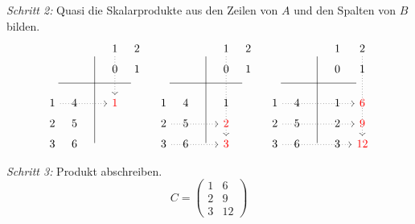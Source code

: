 \bigskip{}

\vbox{
\emph{Schritt 2:} Quasi die Skalarprodukte aus den Zeilen von $A$ und den Spalten von $B$ bilden.
\[
\begin{tikzcd}[sep=tiny]
                      &   & \,\arrow[dash]{ddddd} & 1\arrow[dotted]{ddd} & 2\\
                      &   &                       & 0                    & 1\\
\,\arrow[dash]{rrrr}  &   &                       &                      & \,\\
1 \arrow[dotted]{rrr} & 4 &                       & {\color{red}1}\\
2                     & 5\\
3                     & 6 & \,
\end{tikzcd}
%
\quad
%
\begin{tikzcd}[sep=tiny]
                     &   & \,\arrow[dash]{ddddd} & 1\arrow[dotted]{ddddd} & 2 \\
                     &   &                       & 0                      & 1 \\
\,\arrow[dash]{rrrr} &   &                       &                        & \,\\
1                    & 4 &                       & 1                          \\
2\arrow[dotted]{rrr} & 5 &                       & {\color{red}2}             \\
3\arrow[dotted]{rrr} & 6 & \,                    & {\color{red}3}
\end{tikzcd}
%
\quad
%
\begin{tikzcd}[sep=tiny]
                      &   & \,\arrow[dash]{ddddd} & 1 & 2\arrow[dotted]{ddddd}\\
                      &   &                       & 0 & 1               \\
\,\arrow[dash]{rrrr}  &   &                       &   & \,              \\
1\arrow[dotted]{rrrr} & 4 &                       & 1 & {\color{red}6}  \\
2\arrow[dotted]{rrrr} & 5 &                       & 2 & {\color{red}9}  \\
3\arrow[dotted]{rrrr} & 6 & \,                    & 3 & {\color{red}12}
\end{tikzcd}
\]
}

\bigskip{}

\vbox{
\emph{Schritt 3:} Produkt abschreiben.
\[
C = \begin{pmatrix}
  1 & 6\\
  2 & 9\\
  3 & 12
\end{pmatrix}
\]
}


